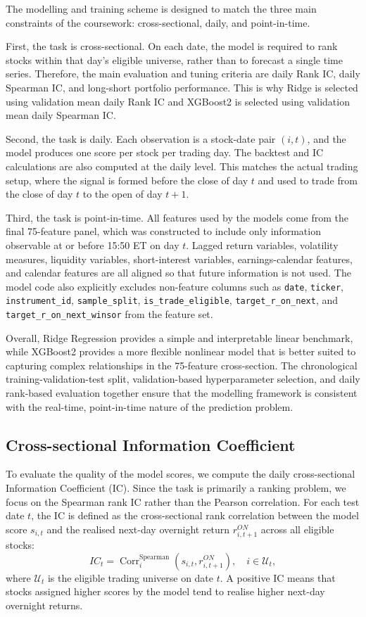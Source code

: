 \documentclass[12pt]{article}
\begin{document}
The modelling and training scheme is designed to match the three main constraints of the coursework: cross-sectional, daily, and point-in-time.

First, the task is cross-sectional. On each date, the model is required to rank stocks within that day's eligible universe, rather than to forecast a single time series. Therefore, the main evaluation and tuning criteria are daily Rank IC, daily Spearman IC, and long-short portfolio performance. This is why Ridge is selected using validation mean daily Rank IC and XGBoost2 is selected using validation mean daily Spearman IC.

Second, the task is daily. Each observation is a stock-date pair $(i,t)$, and the model produces one score per stock per trading day. The backtest and IC calculations are also computed at the daily level. This matches the actual trading setup, where the signal is formed before the close of day $t$ and used to trade from the close of day $t$ to the open of day $t+1$.

Third, the task is point-in-time. All features used by the models come from the final 75-feature panel, which was constructed to include only information observable at or before 15:50 ET on day $t$. Lagged return variables, volatility measures, liquidity variables, short-interest variables, earnings-calendar features, and calendar features are all aligned so that future information is not used. The model code also explicitly excludes non-feature columns such as \texttt{date}, \texttt{ticker}, \texttt{instrument\_id}, \texttt{sample\_split}, \texttt{is\_trade\_eligible}, \texttt{target\_r\_on\_next}, and \texttt{target\_r\_on\_next\_winsor} from the feature set.

Overall, Ridge Regression provides a simple and interpretable linear benchmark, while XGBoost2 provides a more flexible nonlinear model that is better suited to capturing complex relationships in the 75-feature cross-section. The chronological training-validation-test split, validation-based hyperparameter selection, and daily rank-based evaluation together ensure that the modelling framework is consistent with the real-time, point-in-time nature of the prediction problem.
\subsection{Cross-sectional Information Coefficient}

To evaluate the quality of the model scores, we compute the daily cross-sectional Information Coefficient (IC). Since the task is primarily a ranking problem, we focus on the Spearman rank IC rather than the Pearson correlation. For each test date \(t\), the IC is defined as the cross-sectional rank correlation between the model score \(s_{i,t}\) and the realised next-day overnight return \(r^{ON}_{i,t+1}\) across all eligible stocks:
\[
IC_t =
\operatorname{Corr}^{\text{Spearman}}_i
\left(
s_{i,t}, r^{ON}_{i,t+1}
\right),
\quad i \in \mathcal{U}_t ,
\]
where \(\mathcal{U}_t\) is the eligible trading universe on date \(t\). A positive IC means that stocks assigned higher scores by the model tend to realise higher next-day overnight returns.
\end{document}
